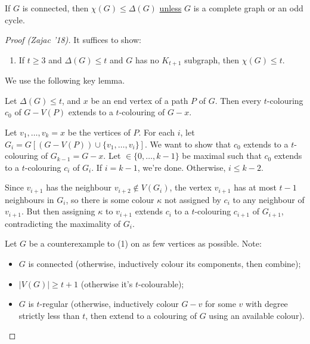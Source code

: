 \documentclass[main.tex]{subfiles}
\begin{document}
\begin{theorem}
  If $G$ is connected, then $\chi(G)\leq\Delta(G)$ \underline{unless} $G$ is
  a complete graph or an odd cycle.
\end{theorem}
\begin{proof}[Proof (Zajac '18)]
  It suffices to show:
  \begin{enumerate}[label=(\arabic*)]
    \item If $t\geq 3$ and $\Delta(G)\leq t$ and $G$ has no $K_{t+1}$ subgraph,
      then $\chi(G)\leq t$.
  \end{enumerate}
  We use the following key lemma.
  \begin{lemma}
    Let $\Delta(G)\leq t$, and $x$ be an end vertex of a path $P$ of $G$.
    Then every $t$-colouring $c_0$ of $G - V(P)$ extends to a $t$-colouring
    of $G - x$.
  \end{lemma}
  \begin{subproof}
    Let $v_1,\ldots,v_k = x$ be the vertices of $P$.
    For each $i$, let $G_i = G[(G - V(P))\cup\{v_1,\ldots,v_i\}]$.
    We want to show that $c_0$ extends to a $t$-colouring of $G_{k-1} = G - x$.
    Let $\in\{0,\ldots,k-1\}$ be maximal such that $c_0$ extends to a
    $t$-colouring $c_i$ of $G_i$.
    If $i = k-1$, we're done.
    Otherwise, $i\leq k-2$.

    Since $v_{i+1}$ has the neighbour $v_{i+2}\notin V(G_i)$, the vertex
    $v_{i+1}$ has at most $t-1$ neighbours in $G_i$, so there is some colour
    $\kappa$ not assigned by $c_i$ to any neighbour of $v_{i+1}$.
    But then assigning $\kappa$ to $v_{i+1}$ extends $c_i$ to a $t$-colouring
    $c_{i+1}$ of $G_{i+1}$, contradicting the maximality of $G_i$.
  \end{subproof}
  Let $G$ be a counterexample to (1) on as few vertices as possible.
  Note:
  \begin{itemize}
    \item $G$ is connected (otherwise, inductively colour its components,
      then combine);

    \item $|V(G)|\geq t+1$ (otherwise it's $t$-colourable);

    \item $G$ is $t$-regular (otherwise, inductively colour $G - v$ for some
      $v$ with degree strictly less than $t$, then extend to a colouring of
      $G$ using an available colour).
  \end{itemize}


\end{proof}
\end{document}

